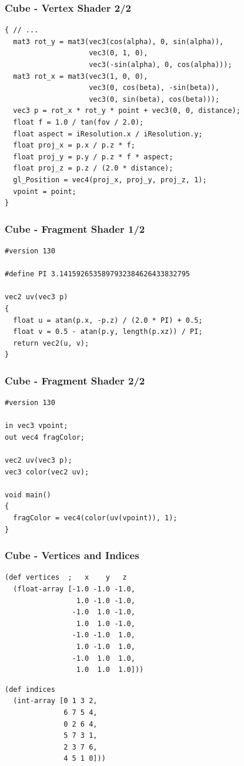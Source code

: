 \documentclass[aspectratio=169,11pt,xcolor=dvipsnames]{beamer}
\begin{document}
\begin{frame}[fragile]
  \frametitle{Cube {-} Vertex Shader 2/2}
  \begin{verbatim}
{ // ...
  mat3 rot_y = mat3(vec3(cos(alpha), 0, sin(alpha)),
                    vec3(0, 1, 0),
                    vec3(-sin(alpha), 0, cos(alpha)));
  mat3 rot_x = mat3(vec3(1, 0, 0),
                    vec3(0, cos(beta), -sin(beta)),
                    vec3(0, sin(beta), cos(beta)));
  vec3 p = rot_x * rot_y * point + vec3(0, 0, distance);
  float f = 1.0 / tan(fov / 2.0);
  float aspect = iResolution.x / iResolution.y;
  float proj_x = p.x / p.z * f;
  float proj_y = p.y / p.z * f * aspect;
  float proj_z = p.z / (2.0 * distance);
  gl_Position = vec4(proj_x, proj_y, proj_z, 1);
  vpoint = point;
}
  \end{verbatim}
\end{frame}

\begin{frame}[fragile]
  \frametitle{Cube {-} Fragment Shader 1/2}
  \begin{verbatim}
#version 130

#define PI 3.1415926535897932384626433832795

vec2 uv(vec3 p)
{
  float u = atan(p.x, -p.z) / (2.0 * PI) + 0.5;
  float v = 0.5 - atan(p.y, length(p.xz)) / PI;
  return vec2(u, v);
}
  \end{verbatim}
\end{frame}

\begin{frame}[fragile]
  \frametitle{Cube {-} Fragment Shader 2/2}
  \begin{verbatim}
#version 130

in vec3 vpoint;
out vec4 fragColor;

vec2 uv(vec3 p);
vec3 color(vec2 uv);

void main()
{
  fragColor = vec4(color(uv(vpoint)), 1);
}
  \end{verbatim}
\end{frame}

\begin{frame}[fragile]
  \frametitle{Cube {-} Vertices and Indices}
  \begin{minipage}[t]{.48\textwidth}
    \begin{verbatim}
(def vertices  ;   x    y   z
  (float-array [-1.0 -1.0 -1.0,
                 1.0 -1.0 -1.0,
                -1.0  1.0 -1.0,
                 1.0  1.0 -1.0,
                -1.0 -1.0  1.0,
                 1.0 -1.0  1.0,
                -1.0  1.0  1.0,
                 1.0  1.0  1.0]))
    \end{verbatim}
  \end{minipage}
  \begin{minipage}[t]{.48\textwidth}
    \begin{verbatim}
(def indices
  (int-array [0 1 3 2,
              6 7 5 4,
              0 2 6 4,
              5 7 3 1,
              2 3 7 6,
              4 5 1 0]))
    \end{verbatim}
  \end{minipage}
\end{frame}
\end{document}
